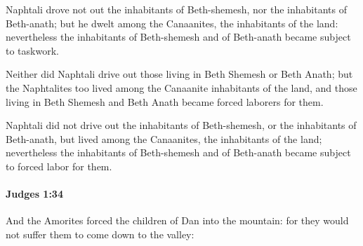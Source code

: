 			\begin{versebox}
					\item[BHS] 
					\item[ASV] Naphtali drove not out the inhabitants of Beth-shemesh, nor the inhabitants of Beth-anath; but he dwelt among the Canaanites, the inhabitants of the land: nevertheless the inhabitants of Beth-shemesh and of Beth-anath became subject to taskwork.
					\item[NIV] Neither did Naphtali drive out those living in Beth Shemesh or Beth Anath; but the Naphtalites too lived among the Canaanite inhabitants of the land, and those living in Beth Shemesh and Beth Anath became forced laborers for them.
					\item[NRSV] Naphtali did not drive out the inhabitants of Beth-shemesh, or the inhabitants of Beth-anath, but lived among the Canaanites, the inhabitants of the land; nevertheless the inhabitants of Beth-shemesh and of Beth-anath became subject to forced labor for them.
			\end{versebox}

		\paragraph{Judges 1:34} %
			\label{JUDGES-1-34}

			And the Amorites forced the children of Dan into the mountain: for they would not suffer them to come down to the valley:

